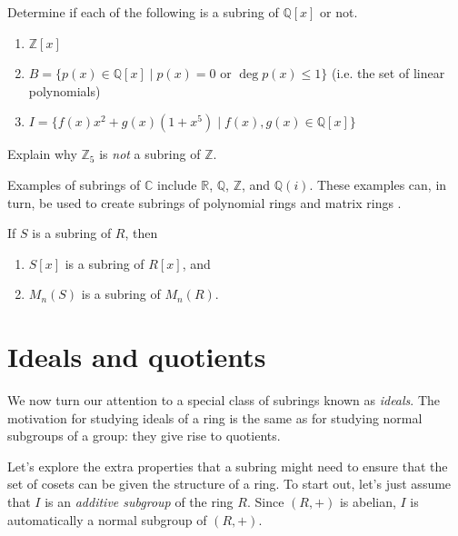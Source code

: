 \begin{problem}
Determine if each of the following is a subring of $\mathbb{Q}[x]$ or not.
\begin{enumerate}
\item $\mathbb{Z}[x]$
\item $B = \{p(x) \in \mathbb{Q}[x] \mid p(x) = 0 \text{ or } \deg p(x) \le 1\}$ (i.e. the set of linear polynomials)
\item $I = \{f(x)x^2 + g(x)(1+x^5)\mid f(x),g(x)\in \mathbb{Q}[x]\}$
\end{enumerate} 
\end{problem}

\begin{problem}
Explain why $\mathbb{Z}_5$ is \emph{not} a subring of $\mathbb{Z}$.
\end{problem}

Examples of subrings of $\mathbb{C}$ include $\mathbb{R}$, $\mathbb{Q}$, $\mathbb{Z}$, and $\mathbb{Q}(i)$. These examples can, in turn, be used to create subrings of polynomial rings and matrix rings .

\begin{theorem}
If $S$ is a subring of $R$, then
\begin{enumerate}
\item $S[x]$ is a subring of $R[x]$, and 
\item $M_n(S)$ is a subring of $M_n(R)$.
\end{enumerate}
\end{theorem}

\section{Ideals and quotients}
We now turn our attention to a special class of subrings known as \emph{ideals}. The motivation for studying ideals of a ring is the same as for studying normal subgroups of a group: they give rise to quotients.

Let's explore the extra properties that a subring might need to ensure that the set of cosets can be given the structure of a ring. To start out, let's just assume that  $I$ is an \emph{additive subgroup} of the ring $R$. Since $(R,+)$ is abelian, $I$ is automatically a normal subgroup of $(R,+)$.  

